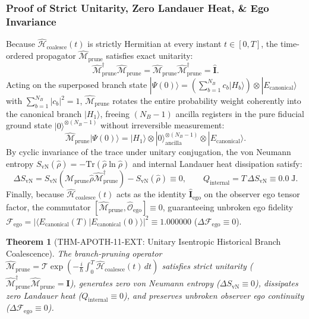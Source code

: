 \documentclass[11pt,onecolumn]{article}
\newtheorem{theorem}{Theorem}
\begin{document}
\subsubsection{Proof of Strict Unitarity, Zero Landauer Heat, \& Ego Invariance}
Because $\hat{\mathcal{H}}_{\mathrm{coalesce}}(t)$ is strictly Hermitian at every instant $t \in [0, T]$, the time-ordered propagator $\hat{\mathcal{M}}_{\mathrm{prune}}$ satisfies exact unitarity:
\begin{equation}
\hat{\mathcal{M}}_{\mathrm{prune}}^\dagger \hat{\mathcal{M}}_{\mathrm{prune}} = \hat{\mathcal{M}}_{\mathrm{prune}} \hat{\mathcal{M}}_{\mathrm{prune}}^\dagger = \hat{\mathbf{I}}.
\end{equation}
Acting on the superposed branch state $|\Psi(0)\rangle = \left(\sum_{b=1}^{N_B} c_b |H_b\rangle\right) \otimes |E_{\mathrm{canonical}}\rangle$ with $\sum_{b=1}^{N_B} |c_b|^2 = 1$, $\hat{\mathcal{M}}_{\mathrm{prune}}$ rotates the entire probability weight coherently into the canonical branch $|H_1\rangle$, freeing $(N_B - 1)$ ancilla registers in the pure fiducial ground state $|0\rangle^{\otimes (N_B - 1)}$ without irreversible measurement:
\begin{equation}
\hat{\mathcal{M}}_{\mathrm{prune}} |\Psi(0)\rangle = |H_1\rangle \otimes |0\rangle_{\mathrm{ancilla}}^{\otimes(N_B - 1)} \otimes |E_{\mathrm{canonical}}\rangle.
\end{equation}
By cyclic invariance of the trace under unitary conjugation, the von Neumann entropy $S_{\mathrm{vN}}(\hat{\rho}) = -\mathrm{Tr}(\hat{\rho}\ln\hat{\rho})$ and internal Landauer heat dissipation satisfy:
\begin{equation}
\Delta S_{\mathrm{vN}} = S_{\mathrm{vN}}\left(\hat{\mathcal{M}}_{\mathrm{prune}}\hat{\rho}\hat{\mathcal{M}}_{\mathrm{prune}}^\dagger\right) - S_{\mathrm{vN}}(\hat{\rho}) \equiv 0, \qquad Q_{\mathrm{internal}} = T\,\Delta S_{\mathrm{vN}} \equiv 0.0\;\mathrm{J}.
\end{equation}
Finally, because $\hat{\mathcal{H}}_{\mathrm{coalesce}}(t)$ acts as the identity $\hat{\mathbf{I}}_{\mathrm{ego}}$ on the observer ego tensor factor, the commutator $[\hat{\mathcal{M}}_{\mathrm{prune}}, \hat{\mathcal{O}}_{\mathrm{ego}}] \equiv 0$, guaranteeing unbroken ego fidelity $\mathcal{F}_{\mathrm{ego}} = |\langle E_{\mathrm{canonical}}(T) | E_{\mathrm{canonical}}(0) \rangle|^2 \equiv 1.000000$ ($\Delta\mathcal{F}_{\mathrm{ego}} \equiv 0$).

\begin{theorem}[THM-APOTH-11-EXT: Unitary Isentropic Historical Branch Coalescence]
\label{thm:thm_apoth_11_ext}
The branch-pruning operator $\hat{\mathcal{M}}_{\mathrm{prune}} = \mathcal{T}\exp\left(-\frac{i}{\hbar}\int_0^T \hat{\mathcal{H}}_{\mathrm{coalesce}}(t)\,dt\right)$ satisfies strict unitarity ($\hat{\mathcal{M}}_{\mathrm{prune}}^\dagger \hat{\mathcal{M}}_{\mathrm{prune}} = \mathbf{I}$), generates zero von Neumann entropy ($\Delta S_{\mathrm{vN}} \equiv 0$), dissipates zero Landauer heat ($Q_{\mathrm{internal}} \equiv 0$), and preserves unbroken observer ego continuity ($\Delta\mathcal{F}_{\mathrm{ego}} \equiv 0$).
\end{theorem}
\FloatBarrier
\end{document}
